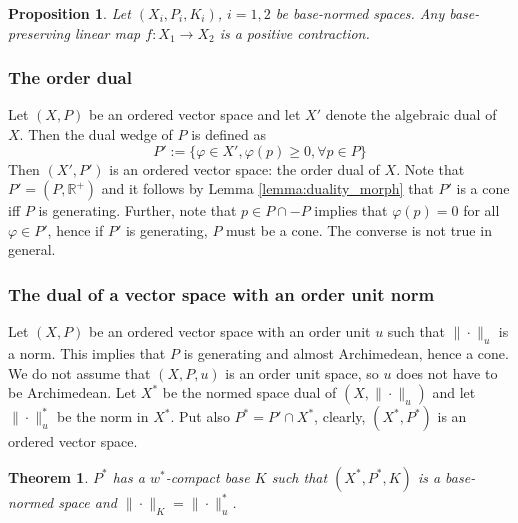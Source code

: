\documentclass[12pt]{article}
\newtheorem{thm}{Theorem}
\newtheorem{prop}{Proposition}
\theoremstyle{remark}
\newcommand{\<}{\langle}
\begin{document}
\begin{prop} Let $(X_i,P_i,K_i)$, $i=1,2$ be base-normed spaces. Any base-preserving linear  map $f:X_1\to X_2$ is a positive contraction.
\end{prop}




\subsubsection*{The order dual}

Let $(X,P)$ be an ordered vector space and let $X'$ denote the algebraic dual of $X$. Then the dual wedge of $P$ is defined as
\[
P':=\{\varphi\in X', \varphi(p)\ge 0, \forall p\in P\}
\]
Then $(X',P')$ is an ordered vector space: the order dual of $X$. Note that  $P'=(P,\mathbb R^+)$ and it follows by  Lemma \ref{lemma:duality_morph} that 
	$P'$ is a cone iff $P$ is generating. Further, note that $p\in P\cap -P$ implies that $\varphi(p)=0$ for all $\varphi\in P'$, hence if $P'$ is generating, $P$ must be a cone. The converse is not true in general.


\subsubsection*{The dual of a vector space with an order unit norm} 

Let $(X,P)$ be an ordered vector space with an order unit $u$ such that $\|\cdot \|_u$ is a norm. This implies that $P$ is generating and almost Archimedean, hence a cone. We do not assume that $(X,P,u)$ is an order unit space, so $u$ does not have to be Archimedean. Let $X^*$ be the normed space dual of $(X, \|\cdot\|_u)$ and let $\|\cdot\|_u^*$ be the norm in $X^*$. Put also $P^*=P'\cap X^*$, clearly, $(X^*,P^*)$ is an ordered vector space.

\begin{thm} $P^*$ has a $w^*$-compact base $K$ such that $(X^*,P^*,K)$ is a base-normed space and $\|\cdot\|_K=\|\cdot\|_u^*$. 

\end{thm}
\end{document}
